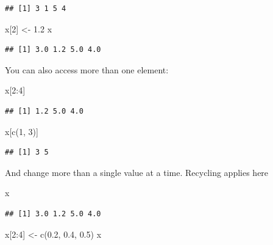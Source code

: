 \documentclass[
]{book}
\newenvironment{Shaded}{\begin{snugshade}}{\end{snugshade}}
\newcommand{\DecValTok}[1]{\textcolor[rgb]{0.00,0.00,0.81}{#1}}
\newcommand{\FloatTok}[1]{\textcolor[rgb]{0.00,0.00,0.81}{#1}}
\newcommand{\FunctionTok}[1]{\textcolor[rgb]{0.00,0.00,0.00}{#1}}
\newcommand{\NormalTok}[1]{#1}
\newcommand{\OtherTok}[1]{\textcolor[rgb]{0.56,0.35,0.01}{#1}}
\newcommand{\SpecialCharTok}[1]{\textcolor[rgb]{0.00,0.00,0.00}{#1}}
\begin{document}
\begin{verbatim}
## [1] 3 1 5 4
\end{verbatim}

\begin{Shaded}
\begin{Highlighting}[]
\NormalTok{x[}\DecValTok{2}\NormalTok{] }\OtherTok{\textless{}{-}} \FloatTok{1.2}
\NormalTok{x}
\end{Highlighting}
\end{Shaded}

\begin{verbatim}
## [1] 3.0 1.2 5.0 4.0
\end{verbatim}

You can also access more than one element:

\begin{Shaded}
\begin{Highlighting}[]
\NormalTok{x[}\DecValTok{2}\SpecialCharTok{:}\DecValTok{4}\NormalTok{]}
\end{Highlighting}
\end{Shaded}

\begin{verbatim}
## [1] 1.2 5.0 4.0
\end{verbatim}

\begin{Shaded}
\begin{Highlighting}[]
\NormalTok{x[}\FunctionTok{c}\NormalTok{(}\DecValTok{1}\NormalTok{, }\DecValTok{3}\NormalTok{)]}
\end{Highlighting}
\end{Shaded}

\begin{verbatim}
## [1] 3 5
\end{verbatim}

And change more than a single value at a time. Recycling applies here

\begin{Shaded}
\begin{Highlighting}[]
\NormalTok{x}
\end{Highlighting}
\end{Shaded}

\begin{verbatim}
## [1] 3.0 1.2 5.0 4.0
\end{verbatim}

\begin{Shaded}
\begin{Highlighting}[]
\NormalTok{x[}\DecValTok{2}\SpecialCharTok{:}\DecValTok{4}\NormalTok{] }\OtherTok{\textless{}{-}} \FunctionTok{c}\NormalTok{(}\FloatTok{0.2}\NormalTok{, }\FloatTok{0.4}\NormalTok{, }\FloatTok{0.5}\NormalTok{)}
\NormalTok{x}
\end{Highlighting}
\end{Shaded}
\end{document}
